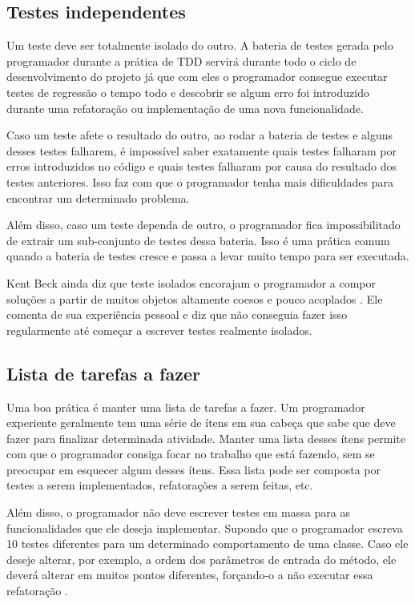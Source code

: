 \subsection{Testes independentes}
\label{subsec:testes-independentes}

Um teste deve ser totalmente isolado do outro. A bateria de testes gerada pelo programador durante a prática de TDD servirá
durante todo o ciclo de desenvolvimento do projeto já que com eles o programador consegue executar testes de regressão
o tempo todo e descobrir se algum erro foi introduzido durante uma refatoração ou implementação de uma nova funcionalidade.

Caso um teste afete o resultado do outro, ao rodar a bateria de testes e alguns desses testes falharem, é impossível
saber exatamente quais testes falharam por erros introduzidos no código e quais testes falharam por causa do resultado
dos testes anteriores. Isso faz com que o programador tenha mais dificuldades para encontrar um determinado problema.

Além disso, caso um teste dependa de outro, o programador fica impossibilitado de extrair um sub-conjunto de testes dessa
bateria. Isso é uma prática comum quando a bateria de testes cresce e passa a levar muito tempo para ser executada.

Kent Beck ainda diz que teste isolados encorajam o programador a compor soluções a partir de muitos objetos altamente coesos
e pouco acoplados \cite{TDDByExample}. Ele comenta de sua experiência pessoal e diz que não conseguia fazer isso regularmente até
começar a escrever testes realmente isolados. 

\subsection{Lista de tarefas a fazer}
\label{subsec:lista-a-fazer}

Uma boa prática é manter uma lista de tarefas a fazer. Um programador experiente geralmente tem uma série de ítens em sua cabeça
que sabe que deve fazer para finalizar determinada atividade. Manter uma lista desses ítens permite com que o programador 
consiga focar no trabalho que está fazendo, sem se preocupar em esquecer algum desses ítens. 
Essa lista pode ser composta por testes a serem implementados, refatorações a serem feitas, etc. 

Além disso, o programador não deve escrever testes em massa para as funcionalidades que ele deseja implementar. Supondo que o programador
escreva 10 testes diferentes para um determinado comportamento de uma classe. Caso ele deseje alterar, por exemplo, a ordem dos parâmetros
de entrada do método, ele deverá alterar em muitos pontos diferentes, forçando-o a não executar essa refatoração \cite{TDDByExample}.

